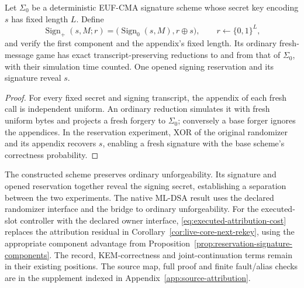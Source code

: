 \begin{proposition}
\label{prop:signature-coin-separation}
Let $\Sigma_0$ be a deterministic EUF-CMA signature scheme whose secret
key encoding $s$ has fixed length $L$. Define
\[
 \operatorname{Sign}_{+}(s,M;r)
   =\bigl(\operatorname{Sign}_0(s,M),r\oplus s\bigr),
 \qquad r\leftarrow\{0,1\}^{L},
\]
and verify the first component and the appendix's fixed length.
Its ordinary fresh-message game has exact transcript-preserving
reductions to and from that of $\Sigma_0$, with their simulation time counted.
One opened signing reservation and its signature reveal $s$.
\end{proposition}
\begin{proof}
For every fixed secret and signing transcript, the appendix of each
fresh call is independent uniform. An ordinary reduction simulates it
with fresh uniform bytes and projects a fresh forgery to $\Sigma_0$;
conversely a base forger ignores the appendices. In the reservation
experiment, XOR of the original randomizer and its appendix recovers
$s$, enabling a fresh signature with the base scheme's correctness
probability.
\end{proof}

The constructed scheme preserves ordinary unforgeability. Its signature
and opened reservation together reveal the signing secret, establishing
a separation between the two experiments. The native ML-DSA result uses
the declared randomizer interface and the bridge to ordinary unforgeability.
For the executed-slot controller with the declared owner interface,
\eqref{eq:executed-attribution-cost} replaces the attribution residual
in Corollary~\ref{cor:live-core-next-rekey}, using the appropriate component
advantage from Proposition~\ref{prop:reservation-signature-components}.
The record, KEM-correctness and joint-continuation terms remain in their
existing positions. The source map, full proof and finite fault/alias
checks are in the supplement indexed in Appendix~\ref{app:source-attribution}.

